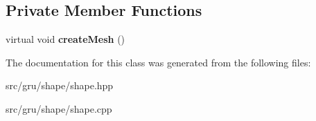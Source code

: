 \subsection*{\-Private \-Member \-Functions}
\begin{DoxyCompactItemize}
\item 
\hypertarget{classglutpp_1_1shape_1_1Sphere_1_1Sphere_aa920c42ce9410ab8b48b07025ea19ff8}{virtual void {\bfseries create\-Mesh} ()}\label{classglutpp_1_1shape_1_1Sphere_1_1Sphere_aa920c42ce9410ab8b48b07025ea19ff8}

\end{DoxyCompactItemize}


\-The documentation for this class was generated from the following files\-:\begin{DoxyCompactItemize}
\item 
src/gru/shape/shape.\-hpp\item 
src/gru/shape/shape.\-cpp\end{DoxyCompactItemize}
